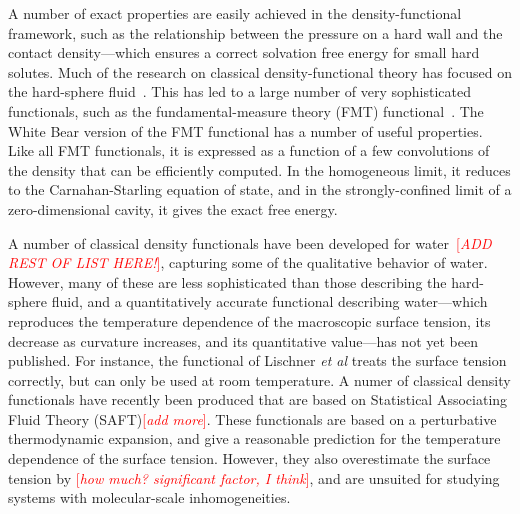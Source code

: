 \documentclass[letterpaper,twocolumn,amsmath,amssymb,prb]{revtex4-1}
\newcommand{\fixme}[1]{\textcolor{red}{[\emph{#1}]}}
\begin{document}
A number of exact properties are easily achieved in the
density-functional framework, such as the relationship between the
pressure on a hard wall and the contact density---which ensures a
correct solvation free energy for small hard solutes.  Much of the
research on classical density-functional theory has focused on the
hard-sphere fluid~\cite{curtin1985, rosenfeld1989, rosenfeld1993,
  rosenfeld1997, tarazona1997, tarazona2000}.  This has led to a large
number of very sophisticated functionals, such as the
fundamental-measure theory (FMT) functional~\cite{rosenfeld1989,
  rosenfeld1993, rosenfeld1997, tarazona1997, tarazona2000,
  roth2002whitebear}.  The White Bear version of the FMT
functional\cite{roth2002whitebear}  has a number of useful
properties.  Like all FMT functionals, it is expressed as a function
of a few convolutions of the density that can be efficiently
computed.  In the homogeneous limit, it reduces to the
Carnahan-Starling equation of state, and in the strongly-confined
limit of a zero-dimensional cavity, it gives the exact free energy.  

A number of classical density functionals have been developed for
water~\cite{ding1987, Yang1992, gloor2002saft, Jaqaman2004,
  clark2006developing, lischner2010classical}\fixme{ADD REST OF
  LIST HERE!}, capturing some of the qualitative behavior of water.
However, many of these are less sophisticated than those describing
the hard-sphere fluid, and a quantitatively accurate functional
describing water---which reproduces the temperature dependence of the
macroscopic surface tension, its decrease as curvature increases, and
its quantitative value---has not yet been published.  For instance,
the functional of Lischner \emph{et al}\cite{lischner2010classical}
treats the surface tension correctly, but can only be used at room
temperature.  A numer of classical density functionals have recently
been produced that are based on Statistical Associating Fluid Theory
(SAFT)\cite{gloor2002saft, clark2006developing}\fixme{add
  more}.  These functionals are based on a perturbative thermodynamic
expansion, and give a reasonable prediction for the temperature
dependence of the surface tension.  However, they also overestimate
the surface tension by \fixme{how much? significant factor, I
  think}, and are unsuited for studying systems with molecular-scale
inhomogeneities.

\end{document}
